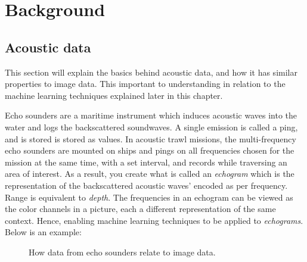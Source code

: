 \chapter{Background}

\section{Acoustic data}
    This section will explain the basics behind acoustic data, and how it has similar properties to image data. This important to understanding in relation to the machine learning techniques explained later in this chapter. 
    
    Echo sounders are a maritime instrument which induces acoustic waves into the water and logs the backscattered soundwaves\cite{brautaset2020acoustic}. A single emission is called a ping, and is stored is stored as values. In acoustic trawl missions, the multi-frequency echo sounders are mounted on ships and pings on all frequencies chosen for the mission at the same time, with a set interval, and records while traversing an area of interest. As a result, you create what is called an \textit{echogram} which is the representation of the backscattered acoustic waves' encoded as  per frequency. Range is equivalent to \textit{depth}. The frequencies in an echogram can be viewed as the color channels in a picture, each a different representation of the same context. Hence, enabling machine learning techniques to be applied to \textit{echograms}. Below is an example:
    
    
    \begin{figure}[H]
        \centering
        
        
        
        
        \caption[Frequency channels and color channels]{How data from echo sounders relate to image data.}
        \label{accoustic data and color channels fig}
        
        \end{figure}
    

